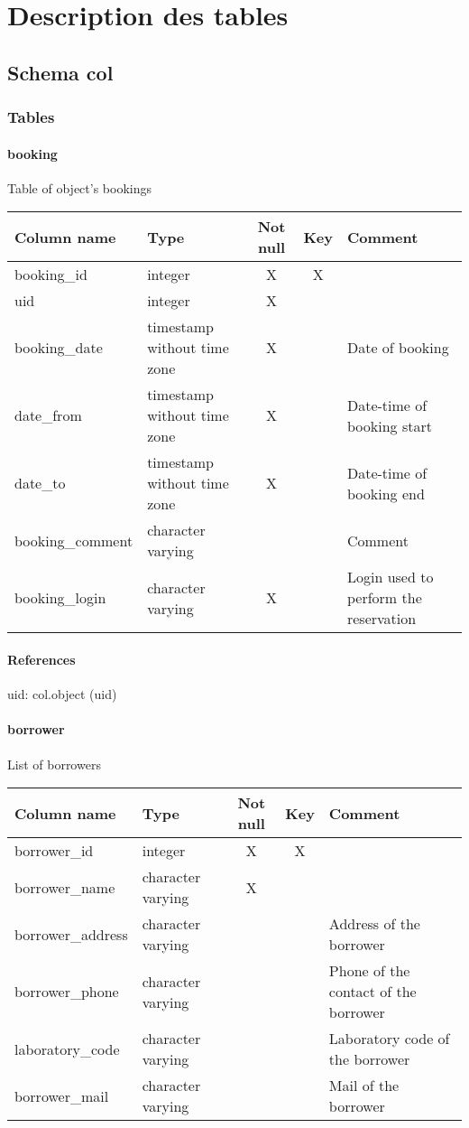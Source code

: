 \section{Description des tables}

\subsection{Schema col}
\subsubsection{Tables}
\paragraph{booking}
Table of object's bookings

\begin{tabular}{|l| p{2cm}|c|c| p{5cm}|}
\hline
Column name & Type & Not null & Key & Comment \\
\hline
booking\_id & integer & X & X & \\
uid & integer & X &  & \\
booking\_date & timestamp without time zone & X &  & Date of booking\\
date\_from & timestamp without time zone & X &  & Date-time of booking start\\
date\_to & timestamp without time zone & X &  & Date-time of booking end\\
booking\_comment & character varying &  &  & Comment\\
booking\_login & character varying & X &  & Login used to perform the reservation\\
\hline
\end{tabular}
\paragraph{References}
uid: col.object (uid)

\paragraph{borrower}
List of borrowers

\begin{tabular}{|l| p{2cm}|c|c| p{5cm}|}
\hline
Column name & Type & Not null & Key & Comment \\
\hline
borrower\_id & integer & X & X & \\
borrower\_name & character varying & X &  & \\
borrower\_address & character varying &  &  & Address of the borrower\\
borrower\_phone & character varying &  &  & Phone of the contact of the borrower\\
laboratory\_code & character varying &  &  & Laboratory code of the borrower\\
borrower\_mail & character varying &  &  & Mail of the borrower\\
\hline
\end{tabular}
